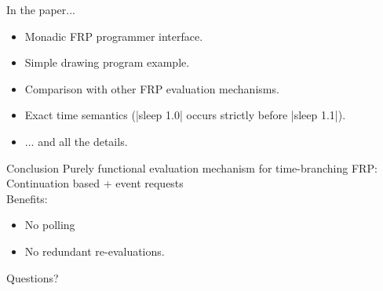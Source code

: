 \documentclass{beamer}
\begin{document}
\begin{frame}{In the paper...}
\begin{itemize}
\item Monadic FRP programmer interface.
\item Simple drawing program example.
\item Comparison with other FRP evaluation mechanisms.
\item Exact time semantics (|sleep 1.0| occurs strictly before |sleep 1.1|).

\item ... and all the details.
\end{itemize}

\end{frame}

\begin{frame}{Conclusion}
\noindent Purely functional evaluation mechanism for time-branching FRP:\\
\hspace{0.5cm}Continuation based + event requests\\
Benefits:
\begin{itemize}
\item No polling
\item No redundant re-evaluations.
\end{itemize}
\pause
Questions?
\end{frame}
\end{document}
